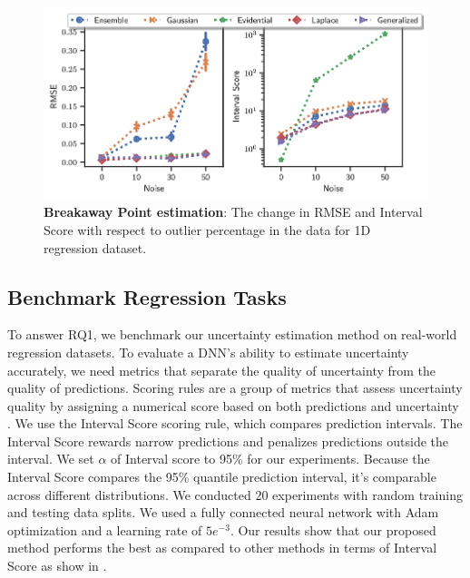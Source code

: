 \documentclass[letterpaper, 10 pt, conference]{ieeeconf}  %
\begin{document}
\begin{figure}[b]
	\includegraphics[width=\linewidth]{fig/noise_RMSE_IS_point_plot.png}	
	\caption{\textbf{Breakaway Point estimation}: The change in RMSE and Interval Score with respect to outlier percentage in the data for 1D regression dataset.  
		\label{fig:breakawayExperiment}
	}
\end{figure}

\subsection{Benchmark Regression Tasks}
To answer RQ1, we benchmark our uncertainty estimation method on real-world regression datasets. 
To evaluate a DNN's ability to estimate uncertainty accurately, we need metrics that separate the quality of uncertainty from the quality of predictions. Scoring rules are a group of metrics that assess uncertainty quality by assigning a numerical score based on both predictions and uncertainty \cite{gneiting2007strictly}.
We use the Interval Score scoring rule, which compares prediction intervals.
The Interval Score rewards narrow predictions and penalizes predictions outside the interval. We set $\alpha$ of Interval score to 95\% for our experiments. 
Because the Interval Score compares the 95\% quantile prediction interval, it's comparable across different distributions.
We conducted 20 experiments with random training and testing data splits. We used a fully connected neural network with Adam optimization and a learning rate of $5e^{-3}$. Our results show that our proposed method performs the best as compared to other methods in terms of Interval Score as show in .
\end{document}
